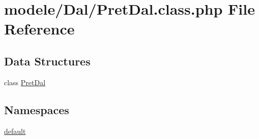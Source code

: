 \hypertarget{_pret_dal_8class_8php}{}\section{modele/\+Dal/\+Pret\+Dal.class.\+php File Reference}
\label{_pret_dal_8class_8php}
\subsection*{Data Structures}
\begin{DoxyCompactItemize}
\item 
class \hyperlink{class_pret_dal}{Pret\+Dal}
\end{DoxyCompactItemize}
\subsection*{Namespaces}
\begin{DoxyCompactItemize}
\item 
 \hyperlink{namespacedefault}{default}
\end{DoxyCompactItemize}
